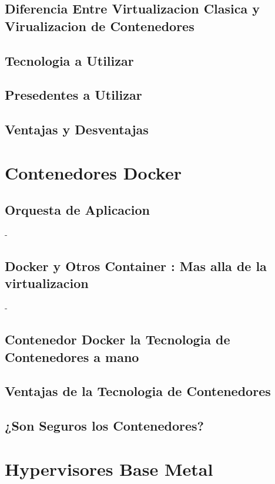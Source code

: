 \documentclass[%
 reprint,
 amsmath,amssymb,
 aps,
]{revtex4-1}
\begin{document}
\subsection{Diferencia Entre Virtualizacion Clasica y Virualizacion de Contenedores}
\subsection{Tecnologia a Utilizar}
\subsection{Presedentes a Utilizar}
\subsection{Ventajas y Desventajas}


\section{Contenedores Docker}\label{sec:6}
\subsection{Orquesta de Aplicacion}
-  
\subsection{Docker y Otros Container : Mas alla de la virtualizacion}
- 
\subsection{Contenedor Docker la Tecnologia de Contenedores a mano}
\subsection{Ventajas de la Tecnologia de Contenedores}
\subsection{¿Son Seguros los Contenedores?}

\section {Hypervisores Base Metal}\label{sec:7}
\end{document}
